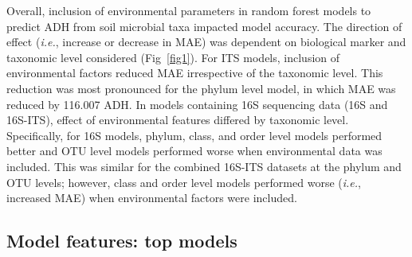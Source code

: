 \documentclass[
  10pt,
  letterpaper,
]{article}
\begin{document}
Overall, inclusion of environmental parameters in random forest models
to predict ADH from soil microbial taxa impacted model accuracy. The
direction of effect (\emph{i.e.}, increase or decrease in MAE) was
dependent on biological marker and taxonomic level considered
(Fig~\ref{fig1}). For ITS models, inclusion of environmental factors
reduced MAE irrespective of the taxonomic level. This reduction was most
pronounced for the phylum level model, in which MAE was reduced by
116.007 ADH. In models containing 16S sequencing data (16S and 16S-ITS),
effect of environmental features differed by taxonomic level.
Specifically, for 16S models, phylum, class, and order level models
performed better and OTU level models performed worse when environmental
data was included. This was similar for the combined 16S-ITS datasets at
the phylum and OTU levels; however, class and order level models
performed worse (\emph{i.e.}, increased MAE) when environmental factors
were included.

\subsection{Model features: top models}\label{model-features-top-models}
\end{document}
